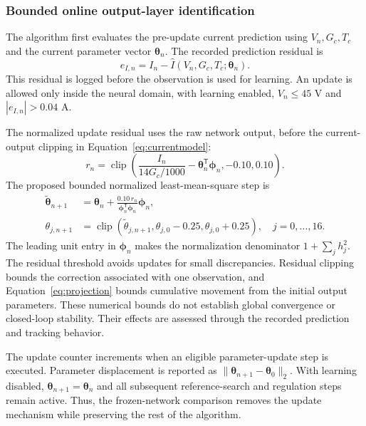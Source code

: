 \documentclass[Acad.Energy.,researcharticle,9pt,twoside,oneauthor]{Definitions/jams_academia}
\begin{document}
\subsubsection{Bounded online output-layer identification}
The algorithm first evaluates the pre-update current prediction using $V_n,G_c,T_c$ and the current parameter vector $\symbf{\theta}_n$. The recorded prediction residual is
\begin{equation}
 e_{I,n}=I_n-\widehat I(V_n,G_c,T_c;\symbf{\theta}_n).
 \label{eq:preresidual}
\end{equation}
This residual is logged before the observation is used for learning. An update is allowed only inside the neural domain, with learning enabled, $V_n\leq45$ V and $|e_{I,n}|>0.04$ A.

The normalized update residual uses the raw network output, before the current-output clipping in Equation~\ref{eq:currentmodel}:
\begin{equation}
 r_n=\operatorname{clip}\left(
 \frac{I_n}{14G_c/1000}-\symbf{\theta}_n^{\mathsf T}\symbf{\phi}_n,
 -0.10,0.10\right).
\end{equation}
The proposed bounded normalized least-mean-square step is
\begin{align}
 \widetilde{\symbf{\theta}}_{n+1}
 &=\symbf{\theta}_n+
 \frac{0.10\,r_n}{\symbf{\phi}_n^{\mathsf T}\symbf{\phi}_n}
 \symbf{\phi}_n,\\
 \theta_{j,n+1}
 &=\operatorname{clip}(\widetilde\theta_{j,n+1},
 \theta_{j,0}-0.25,\theta_{j,0}+0.25),\quad j=0,\ldots,16.
 \label{eq:projection}
\end{align}
The leading unit entry in $\symbf{\phi}_n$ makes the normalization denominator $1+\sum_j h_j^2$. The residual threshold avoids updates for small discrepancies. Residual clipping bounds the correction associated with one observation, and Equation~\ref{eq:projection} bounds cumulative movement from the initial output parameters. These numerical bounds do not establish global convergence or closed-loop stability. Their effects are assessed through the recorded prediction and tracking behavior.

The update counter increments when an eligible parameter-update step is executed. Parameter displacement is reported as $\|\symbf{\theta}_{n+1}-\symbf{\theta}_0\|_2$. With learning disabled, $\symbf{\theta}_{n+1}=\symbf{\theta}_n$ and all subsequent reference-search and regulation steps remain active. Thus, the frozen-network comparison removes the update mechanism while preserving the rest of the algorithm.
\end{document}
